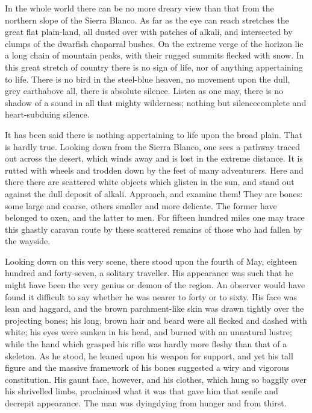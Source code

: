 \documentclass[12pt,english]{book}
\begin{document}
In the whole world there can be no more dreary view than that from
the northern slope of the Sierra Blanco. As far as the eye can reach
stretches the great flat plain-land, all dusted over with patches
of alkali, and intersected by clumps of the dwarfish chaparral bushes.
On the extreme verge of the horizon lie a long chain of mountain peaks,
with their rugged summits flecked with snow. In this great stretch
of country there is no sign of life, nor of anything appertaining
to life. There is no bird in the steel-blue heaven, no movement upon
the dull, grey earth\mdsh{---}above all, there is absolute silence.
Listen as one may, there is no shadow of a sound in all that mighty
wilderness; nothing but silence\mdsh{---}complete and heart-subduing
silence.

It has been said there is nothing appertaining to life upon the broad
plain. That is hardly true. Looking down from the Sierra Blanco, one
sees a pathway traced out across the desert, which winds away and
is lost in the extreme distance. It is rutted with wheels and trodden
down by the feet of many adventurers. Here and there there are scattered
white objects which glisten in the sun, and stand out against the
dull deposit of alkali. Approach, and examine them! They are bones:
some large and coarse, others smaller and more delicate. The former
have belonged to oxen, and the latter to men. For fifteen hundred
miles one may trace this ghastly caravan route by these scattered
remains of those who had fallen by the wayside.

Looking down on this very scene, there stood upon the fourth of May,
eighteen hundred and forty-seven, a solitary traveller. His appearance
was such that he might have been the very genius or demon of the region.
An observer would have found it difficult to say whether he was nearer
to forty or to sixty. His face was lean and haggard, and the brown
parchment-like skin was drawn tightly over the projecting bones; his
long, brown hair and beard were all flecked and dashed with white;
his eyes were sunken in his head, and burned with an unnatural lustre;
while the hand which grasped his rifle was hardly more fleshy than
that of a skeleton. As he stood, he leaned upon his weapon for support,
and yet his tall figure and the massive framework of his bones suggested
a wiry and vigorous constitution. His gaunt face, however, and his
clothes, which hung so baggily over his shrivelled limbs, proclaimed
what it was that gave him that senile and decrepit appearance. The
man was dying\mdsh{---}dying from hunger and from thirst.
\end{document}
